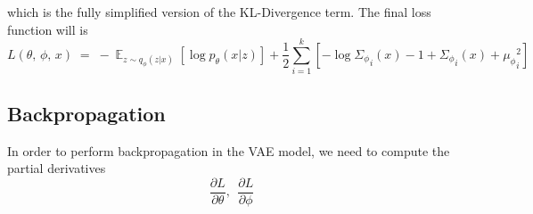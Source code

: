 \documentclass[12pt]{report}
\DeclareMathOperator{\E}{\mathbb{E}}
\begin{document}
\noindent which is the fully simplified version of the KL-Divergence term. The final
loss function will is
\begin{equation}\label{eq:final_loss}
    L(\theta,\, \phi,\, x)
        \;=\; -\E_{z \sim q_{\phi}(z | x)} \left[\log p_{\theta}(x | z) \right]
        + \frac{1}{2} \sum_{i=1}^k \left[ - \log {\Sigma_{\phi}}_i(x)
            - 1
            + {\Sigma_{\phi}}_i(x)
            + {\mu_{\phi}}_i^2 \right]
\end{equation}

\subsection*{Backpropagation}
In order to perform backpropagation in the VAE model, we need to compute the partial
derivatives $$\frac{\partial L}{\partial \theta},\;\, \frac{\partial L}{\partial \phi}$$
\end{document}
